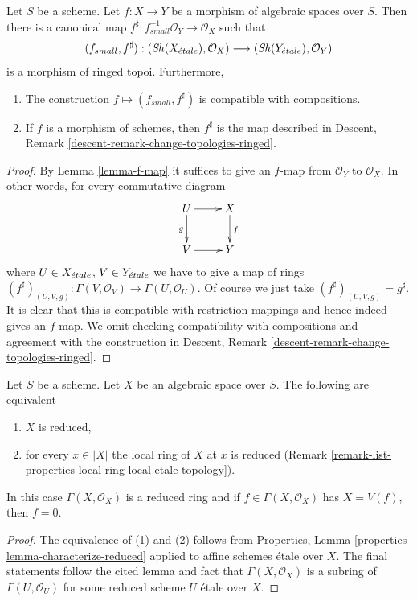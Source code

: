\begin{lemma}
\label{lemma-morphism-ringed-topoi}
Let $S$ be a scheme.
Let $f : X \to Y$ be a morphism of algebraic spaces over $S$.
Then there is a canonical map
$f^\sharp : f_{small}^{-1}\mathcal{O}_Y \to \mathcal{O}_X$ such that
$$
(f_{small}, f^\sharp) :
(\mathop{\mathit{Sh}}\nolimits(X_{\acute{e}tale}), \mathcal{O}_X)
\longrightarrow
(\mathop{\mathit{Sh}}\nolimits(Y_{\acute{e}tale}), \mathcal{O}_Y)
$$
is a morphism of ringed topoi. Furthermore,
\begin{enumerate}
\item The construction $f \mapsto (f_{small}, f^\sharp)$ is compatible with
compositions.
\item If $f$ is a morphism of schemes, then $f^\sharp$ is the map described in
Descent, Remark \ref{descent-remark-change-topologies-ringed}.
\end{enumerate}
\end{lemma}

\begin{proof}
By Lemma \ref{lemma-f-map} it suffices to give an $f$-map from
$\mathcal{O}_Y$ to $\mathcal{O}_X$. In other words, for every
commutative diagram
$$
\xymatrix{
U \ar[d]_g \ar[r] & X \ar[d]^f \\
V \ar[r] & Y
}
$$
where $U \in X_{\acute{e}tale}$, $V \in Y_{\acute{e}tale}$ we have to give a
map of rings
$
(f^\sharp)_{(U, V, g)} :
\Gamma(V, \mathcal{O}_V)
\to
\Gamma(U, \mathcal{O}_U).
$
Of course we just take $(f^\sharp)_{(U, V, g)} = g^\sharp$.
It is clear that this is compatible with restriction mappings
and hence indeed gives an $f$-map.
We omit checking compatibility with compositions and agreement with the
construction in
Descent, Remark \ref{descent-remark-change-topologies-ringed}.
\end{proof}

\begin{lemma}
\label{lemma-reduced-space}
Let $S$ be a scheme. Let $X$ be an algebraic space over $S$.
The following are equivalent
\begin{enumerate}
\item $X$ is reduced,
\item for every $x \in |X|$ the local ring of $X$ at $x$ is
reduced (Remark \ref{remark-list-properties-local-ring-local-etale-topology}).
\end{enumerate}
In this case $\Gamma(X, \mathcal{O}_X)$ is a reduced ring and
if $f \in \Gamma(X, \mathcal{O}_X)$ has $X = V(f)$, then $f = 0$.
\end{lemma}

\begin{proof}
The equivalence of (1) and (2) follows from
Properties, Lemma \ref{properties-lemma-characterize-reduced}
applied to affine schemes \'etale over $X$. The final statements
follow the cited lemma and fact that $\Gamma(X, \mathcal{O}_X)$ is
a subring of $\Gamma(U, \mathcal{O}_U)$ for some
reduced scheme $U$ \'etale over $X$.
\end{proof}







